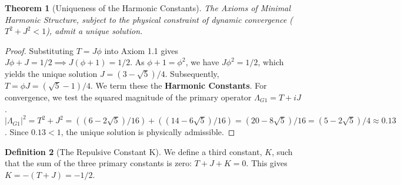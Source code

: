 \documentclass{article}
\theoremstyle{plain}
\newtheorem{theorem}{Theorem}[section]
\theoremstyle{definition}
\newtheorem{definition}[theorem]{Definition}
\theoremstyle{remark}
\begin{document}
\begin{theorem}[Uniqueness of the Harmonic Constants]
The Axioms of Minimal Harmonic Structure, subject to the physical constraint of dynamic convergence ($T^2+J^2 < 1$), admit a unique solution.
\end{theorem}
\begin{proof}
Substituting $T=J\phi$ into Axiom 1.1 gives $J\phi+J=1/2 \implies J(\phi+1)=1/2$. As $\phi+1=\phi^2$, we have $J\phi^2=1/2$, which yields the unique solution $J=(3-\sqrt{5})/4$. Subsequently, $T=\phi J = (\sqrt{5}-1)/4$. We term these the \textbf{Harmonic Constants}. For convergence, we test the squared magnitude of the primary operator $\Lambda_{G1} = T+iJ$. $|\Lambda_{G1}|^2 = T^2+J^2 = ((6-2\sqrt{5})/16) + ((14-6\sqrt{5})/16) = (20-8\sqrt{5})/16 = (5-2\sqrt{5})/4 \approx 0.13$. Since $0.13 < 1$, the unique solution is physically admissible.
\end{proof}

\begin{definition}[The Repulsive Constant K]
We define a third constant, $K$, such that the sum of the three primary constants is zero: $T+J+K=0$. This gives $K = -(T+J) = -1/2$.
\end{definition}
\end{document}
